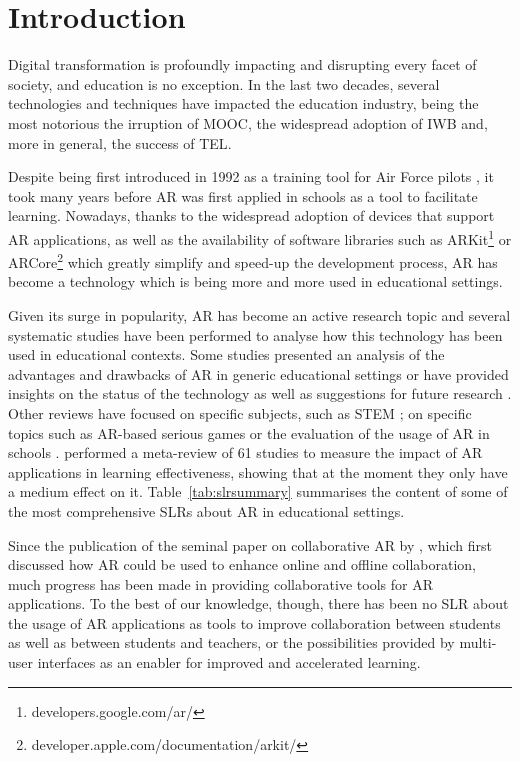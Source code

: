 \section{Introduction} \label{sec:introduction}
Digital transformation is profoundly impacting and disrupting every facet of society, and education is no exception. In the last two decades, several technologies and techniques have impacted the education industry, being the most notorious the irruption of \gls{MOOC}, the widespread adoption of \gls{IWB} and, more in general, the success of \gls{TEL}. 

Despite being first introduced in 1992 as a training tool for Air Force pilots \citep{caudell1992augmented}, it took many years before \gls{AR} was first applied in schools as a tool to facilitate learning. Nowadays, thanks to the widespread adoption of devices that support \gls{AR} applications, as well as the availability of software libraries such as ARKit\footnote{developers.google.com/ar/} or ARCore\footnote{developer.apple.com/documentation/arkit/} which greatly simplify and speed-up the development process, \gls{AR} has become a technology which is being more and more used in educational settings.


Given its surge in popularity, \gls{AR} has become an active research topic and several systematic studies have been performed to analyse how this technology has been used in educational contexts. Some studies presented an analysis of the advantages and drawbacks of \gls{AR} in generic educational settings \citep{akccayir2017advantages, radu2014augmented, diegmann2015benefits} or have provided insights on the status of the technology as well as suggestions for future research \citep{cheng2013affordances, arici2019research, bacca2014augmented, pellas2019augmenting}. Other reviews have focused on specific subjects, such as \gls{STEM} \citep{ibanez2018augmented, nielsen2016augmented}; on specific topics such as \gls{AR}-based serious games \citep{li2017augmented, bartolome2011can, laine2018mobile} or the evaluation of the usage of \gls{AR} in schools \citep{da2019perspectives, chen2017review}. \citet{garzon2019systematic} performed a meta-review of 61 studies to measure the impact of \gls{AR} applications in learning effectiveness, showing that at the moment they only have a medium effect on it. Table~\ref{tab:slrsummary} summarises the content of some of the most comprehensive \glspl{SLR} about \gls{AR} in educational settings.

Since the publication of the seminal paper on collaborative \gls{AR} by \citet{billinghurst2002collaborative}, which first discussed how AR could be used to enhance online and offline collaboration, much progress has been made in providing collaborative tools for \gls{AR} applications. To the best of our knowledge, though, there has been no \gls{SLR} about the usage of \gls{AR} applications as tools to improve collaboration between students as well as between students and teachers, or the possibilities provided by multi-user interfaces as an enabler for improved and accelerated learning. 

